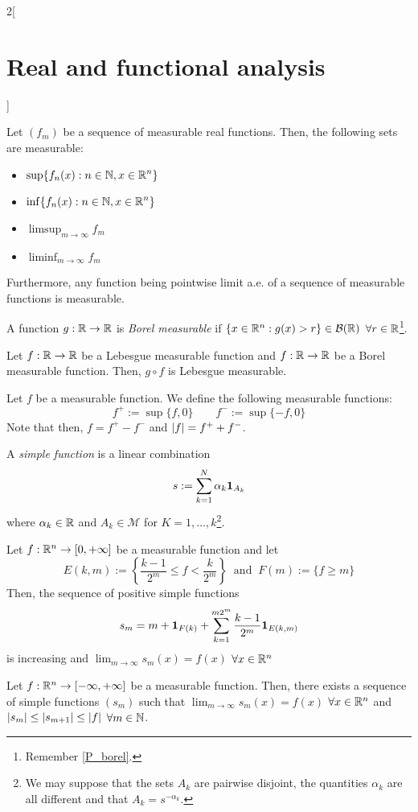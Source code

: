\documentclass[../../../main_math.tex]{subfiles}
\begin{document}
\begin{multicols}{2}[\section{Real and functional analysis}]
\begin{proposition}
    Let $(f_m)$ be a sequence of measurable real functions. Then, the following sets are measurable:
    \begin{itemize}
      \item $\displaystyle\sup\{f_n(x):n\in\mathbb{N},x\in\mathbb{R}^n\}$
      \item $\displaystyle\inf\{f_n(x):n\in\mathbb{N},x\in\mathbb{R}^n\}$
      \item $\displaystyle\limsup_{m\to\infty} f_m$
      \item $\displaystyle\liminf_{m\to\infty} f_m$
    \end{itemize}
    Furthermore, any function being pointwise limit a.e. of a sequence of measurable functions is measurable.
  \end{proposition}
  \begin{definition}
    A function $g:\mathbb{R}\rightarrow\mathbb{R}$ is \emph{Borel measurable} if $\{x\in\mathbb{R}^n:g(x)> r\}\in \mathcal{B}(\mathbb{R})$ $\forall r\in\mathbb{R}$\footnote{Remember \cref{P_borel}.}.
  \end{definition}
  \begin{proposition}
    Let $f:\mathbb{R}\rightarrow\mathbb{R}$ be a Lebesgue measurable function and $f:\mathbb{R}\rightarrow\mathbb{R}$ be a Borel measurable function. Then, $g\circ f$ is Lebesgue measurable.
  \end{proposition}
  \begin{definition}
    Let $f$ be a measurable function. We define the following measurable functions:
    $$f^+:=\sup\{f,0\}\qquad f^-:=\sup\{-f,0\}$$
    Note that then, $f=f^+-f^-$ and $\abs{f}=f^++f^-$.
  \end{definition}
  \begin{definition}
    A \emph{simple function} is a linear combination $$s:=\sum_{k=1}^N\alpha_k\boldsymbol{\mathrm{1}}_{A_k}$$ where $\alpha_k\in\mathbb{R}$ and $A_k\in\mathcal{M}$ for $K=1,\ldots,k$\footnote{We may suppose that the sets $A_k$ are pairwise disjoint, the quantities $\alpha_k$ are all different and that $A_k=s^{-\alpha_k}$.}.
  \end{definition}
  \begin{theorem}
    Let $f:\mathbb{R}^n\rightarrow[0,+\infty]$ be a measurable function and let $$E(k,m):=\left\{\frac{k-1}{2^m}\leq f<\frac{k}{2^m}\right\}\;\;\text{and}\;\; F(m):=\{f\geq m\}$$
    Then, the sequence of positive simple functions $$s_m=m+\boldsymbol{\mathrm{1}}_{F(k)}+\sum_{k=1}^{m2^m}\frac{k-1}{2^m}\boldsymbol{\mathrm{1}}_{E(k,m)}$$ is increasing and $\displaystyle\lim_{m\to\infty}s_m(x)=f(x)$ $\forall x\in\mathbb{R}^n$
  \end{theorem}
  \begin{theorem}
    Let $f:\mathbb{R}^n\rightarrow[-\infty,+\infty]$ be a measurable function. Then, there exists a sequence of simple functions $(s_m)$ such that $\displaystyle\lim_{m\to\infty}s_m(x)=f(x)$ $\forall x\in\mathbb{R}^n$ and $\abs{s_m}\leq\abs{s_{m+1}}\leq \abs{f}$ $\forall m\in\mathbb{N}$.
  \end{theorem}

\end{multicols}
\end{document}
